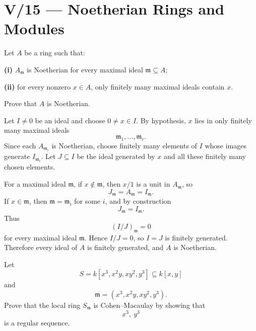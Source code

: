 \section*{V/15 --- Noetherian Rings and Modules}

\begin{problem}[CP-V-0050]
\label{prob:cp-v-0050}
Let \(A\) be a ring such that:

\textbf{(i)} \(A_{\mathfrak m}\) is Noetherian for every maximal ideal
\(\mathfrak m\subseteq A\);

\textbf{(ii)} for every nonzero \(x\in A\), only finitely many maximal ideals
contain \(x\).

Prove that \(A\) is Noetherian.
\end{problem}

\begin{solution}
Let \(I\ne0\) be an ideal and choose \(0\ne x\in I\). By hypothesis, \(x\)
lies in only finitely many maximal ideals
\[
\mathfrak m_1,\dots,\mathfrak m_r.
\]
Since each \(A_{\mathfrak m_i}\) is Noetherian, choose finitely many elements
of \(I\) whose images generate \(I_{\mathfrak m_i}\). Let \(J\subseteq I\)
be the ideal generated by \(x\) and all these finitely many chosen elements.

For a maximal ideal \(\mathfrak m\), if \(x\notin\mathfrak m\), then
\(x/1\) is a unit in \(A_{\mathfrak m}\), so
\[
J_{\mathfrak m}=A_{\mathfrak m}=I_{\mathfrak m}.
\]
If \(x\in\mathfrak m\), then \(\mathfrak m=\mathfrak m_i\) for some \(i\),
and by construction
\[
J_{\mathfrak m}=I_{\mathfrak m}.
\]
Thus
\[
(I/J)_{\mathfrak m}=0
\]
for every maximal ideal \(\mathfrak m\). Hence \(I/J=0\), so \(I=J\) is
finitely generated. Therefore every ideal of \(A\) is finitely generated,
and \(A\) is Noetherian.
\end{solution}


\begin{problem}[CP-V-0056]
\label{prob:cp-v-0056}
Let
\[
S=k[x^3,x^2y,xy^2,y^3]\subseteq k[x,y]
\]
and
\[
\mathfrak m=(x^3,x^2y,xy^2,y^3).
\]
Prove that the local ring \(S_{\mathfrak m}\) is Cohen--Macaulay by showing
that
\[
x^3,\ y^3
\]
is a regular sequence.
\end{problem}

